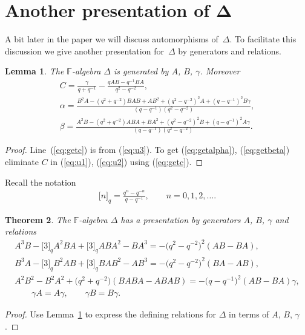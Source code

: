 \documentclass[pdftex]{sigma}
\numberwithin{equation}{section}
\newtheorem{Theorem}{Theorem}[section]
\newtheorem{Lemma}[Theorem]{Lemma}
\begin{document}
\section[Another presentation of $\Delta$]{Another presentation of $\boldsymbol{\Delta}$}


A bit later in the paper
we will discuss automorphisms of~$\Delta $.
To facilitate this discussion
we give
another presentation for~$\Delta $ by generators and relations.

\begin{Lemma}
\label{lem:abgpres}
The $\mathbb F$-algebra $\Delta $ is generated by
$A$, $B$, $\gamma$. Moreover
\begin{gather}
C  =  \frac{\gamma}{q+q^{-1}}
-\frac{qAB-q^{-1}BA}{q^2-q^{-2}},
\label{eq:getc}
\\
\alpha  =  \frac{B^2A-(q^2+q^{-2})BAB+AB^2+
(q^2-q^{-2})^2A+(q-q^{-1})^2B\gamma}{(q-q^{-1})(q^2-q^{-2})},
\label{eq:getalpha}
\\
\beta  =  \frac{A^2B-(q^2+q^{-2})ABA+BA^2+
(q^2-q^{-2})^2B+(q-q^{-1})^2A\gamma}{(q-q^{-1})(q^2-q^{-2})}.
\label{eq:getbeta}
\end{gather}
\end{Lemma}

\begin{proof}\sloppy
Line~(\ref{eq:getc})
is from (\ref{eq:u3}).
To get
(\ref{eq:getalpha}),
(\ref{eq:getbeta})
eliminate $C$ in
(\ref{eq:u1}),
(\ref{eq:u2})
using
(\ref{eq:getc}).
\end{proof}

 Recall the notation
\begin{gather*}
\lbrack n \rbrack_q= \frac{q^n-q^{-n}}{q-q^{-1}}, \qquad
n=0,1,2,\ldots.
\end{gather*}




{\samepage

\begin{Theorem}
\label{prop:altpres}
The $\mathbb F$-algebra $\Delta $ has a  presentation by generators
$A$, $B$, $\gamma$ and
relations
 \begin{gather*}
 A^3B-\lbrack 3\rbrack_q A^2BA+\lbrack 3\rbrack_q ABA^2-BA^3
= -\big(q^2-q^{-2}\big)^2(AB-BA),
\\
 B^3A-\lbrack 3\rbrack_q B^2AB+\lbrack 3\rbrack_q BAB^2-AB^3
= -\big(q^2-q^{-2}\big)^2(BA-AB),
\\
 A^2B^2-B^2A^2+\big(q^2+q^{-2}\big)(BABA-ABAB) = -\big(q-q^{-1}\big)^2(AB-BA)\gamma,
\\
  \qquad \gamma A = A \gamma,   \qquad \gamma B=B \gamma.
 \end{gather*}
\end{Theorem}

\begin{proof}
Use Lemma~\ref{lem:abgpres} to
express the def\/ining relations
for $\Delta $ in terms of $A$, $B$, $\gamma$.
\end{proof}}
\end{document}
